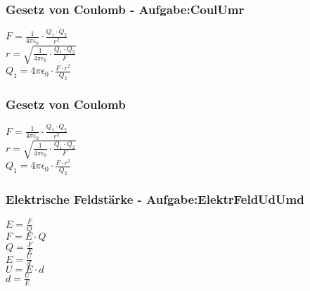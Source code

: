 \subsubsection{Gesetz von Coulomb - Aufgabe:CoulUmr} 
\begin{minipage}{0.45\textwidth} 
$ F = \frac{ 1}{4\pi \epsilon _{0} } \cdot  \frac{Q_{1} \cdot Q_{2} }{  r^{2} } $\\ 
$ r = \sqrt{\frac{  1}{4\pi \epsilon _{0} } \cdot  \frac{Q_{1} \cdot Q_{2} }{  F}} $\\ 
$ Q_{1}  = 4\pi \epsilon _{0}  \cdot  \frac{F\cdot r^{2} }{ Q_{2} } $\\ 
\end{minipage} 
\begin{minipage}{0.45\textwidth} 
 
\end{minipage} 
\subsubsection{Gesetz von Coulomb} 
\begin{minipage}{0.45\textwidth} 
$ F = \frac{ 1}{4\pi \epsilon _{0} } \cdot  \frac{Q_{1} \cdot Q_{2} }{  r^{2} } $\\ 
$ r = \sqrt{\frac{  1}{4\pi \epsilon _{0} } \cdot  \frac{Q_{1} \cdot Q_{2} }{  F}} $\\ 
$ Q_{1}  = 4\pi \epsilon _{0}  \cdot  \frac{F\cdot r^{2} }{ Q_{2} } $\\ 
\end{minipage} 
\begin{minipage}{0.45\textwidth} 
 
\end{minipage} 
\subsubsection{Elektrische Feldstärke - Aufgabe:ElektrFeldUdUmd} 
\begin{minipage}{0.45\textwidth} 
$ E = \frac{F}{Q} $\\ 
$ F = E\cdot Q $\\ 
$ Q = \frac{F}{E} $\\ 
$ E = \frac{U}{d} $\\ 
$ U = E\cdot d $\\ 
$ d = \frac{U}{E} $\\ 
\end{minipage} 
\begin{minipage}{0.45\textwidth} 
 
\end{minipage} 
